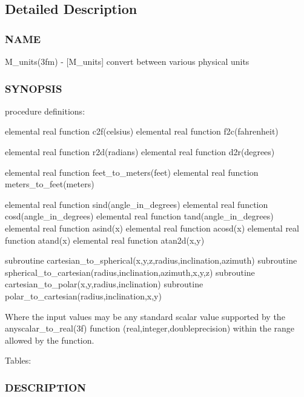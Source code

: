 \subsection{Detailed Description}
\subsubsection*{N\+A\+ME}

M\+\_\+units(3fm) -\/ \mbox{[}M\+\_\+units\mbox{]} convert between various physical units 

\subsubsection*{S\+Y\+N\+O\+P\+S\+IS}

\begin{DoxyVerb}procedure definitions:

   elemental real function c2f(celsius)
   elemental real function f2c(fahrenheit)

   elemental real function r2d(radians)
   elemental real function d2r(degrees)

   elemental real function feet_to_meters(feet)
   elemental real function meters_to_feet(meters)

   elemental real function sind(angle_in_degrees)
   elemental real function cosd(angle_in_degrees)
   elemental real function tand(angle_in_degrees)
   elemental real function asind(x)
   elemental real function acosd(x)
   elemental real function atand(x)
   elemental real function atan2d(x,y)

   subroutine cartesian_to_spherical(x,y,z,radius,inclination,azimuth)
   subroutine spherical_to_cartesian(radius,inclination,azimuth,x,y,z)
   subroutine cartesian_to_polar(x,y,radius,inclination)
   subroutine polar_to_cartesian(radius,inclination,x,y)

Where the input values may be any standard scalar value supported by
the anyscalar_to_real(3f) function (real,integer,doubleprecision) within
the range allowed by the function.

Tables:
\end{DoxyVerb}


\subsubsection*{D\+E\+S\+C\+R\+I\+P\+T\+I\+ON}

